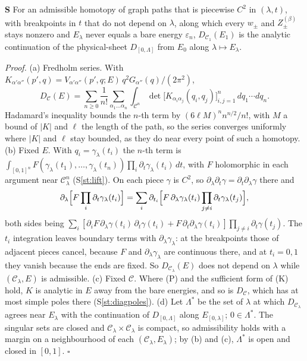 \documentclass[11pt]{article}
\newcounter{stmt}
\newenvironment{stmt}[1]{\par\smallskip\refstepcounter{stmt}\noindent\textbf{S\thestmt}\enspace[\textsf{#1}]\enspace\ignorespaces}{\par\smallskip}
\newcommand{\Sr}[1]{S\ref{#1}}
\begin{document}
\begin{stmt}{theorem}\label{st:continuation}
For an admissible homotopy of graph paths that is piecewise $C^2$ in $(\lambda,t)$, with breakpoints in $t$ that do not depend on $\lambda$, along which every $w_\pm$ and $Z^{(\beta)}_\pm$ stays nonzero and $E_\lambda$ never equals a bare energy $\varepsilon_n$, $D_{\mathcal C_1}(E_1)$ is the analytic continuation of the physical-sheet $D_{[0,\Lambda]}$ from $E_0$ along $\lambda\mapsto E_\lambda$.
\end{stmt}
\noindent\emph{Proof.} (a) Fredholm series. With $K_{\alpha'\alpha''}(p',q)=V_{\alpha'\alpha''}(p',q;E)\,q^2G_{\alpha''}(q)/(2\pi^2)$,
\[
D_{\mathcal C}(E)=\sum_{n\ge0}\frac1{n!}\sum_{\alpha_1\dots\alpha_n}\int_{\mathcal C^n}\det\bigl[K_{\alpha_i\alpha_j}(q_i,q_j)\bigr]_{i,j=1}^{n}\,dq_1\cdots dq_n .
\]
Hadamard's inequality bounds the $n$-th term by $(6\ell M)^nn^{n/2}/n!$, with $M$ a bound of $|K|$ and $\ell$ the length of the path, so the series converges uniformly where $|K|$ and $\ell$ stay bounded, as they do near every point of such a homotopy.
(b) Fixed $E$. With $q_i=\gamma_\lambda(t_i)$ the $n$-th term is $\int_{[0,1]^n}F(\gamma_\lambda(t_1),\dots,\gamma_\lambda(t_n))\prod_i\partial_t\gamma_\lambda(t_i)\,dt$, with $F$ holomorphic in each argument near $\mathcal C_\lambda^n$ (\Sr{st:lift}). On each piece $\gamma$ is $C^2$, so $\partial_\lambda\partial_t\gamma=\partial_t\partial_\lambda\gamma$ there and
\[
\partial_\lambda\Bigl[F\prod_i\partial_t\gamma_\lambda(t_i)\Bigr]=\sum_i\partial_{t_i}\Bigl[F\,\partial_\lambda\gamma_\lambda(t_i)\prod_{j\ne i}\partial_t\gamma_\lambda(t_j)\Bigr],
\]
both sides being $\sum_i[\partial_iF\,\partial_\lambda\gamma(t_i)\,\partial_t\gamma(t_i)+F\,\partial_t\partial_\lambda\gamma(t_i)]\prod_{j\ne i}\partial_t\gamma(t_j)$. The $t_i$ integration leaves boundary terms with $\partial_\lambda\gamma_\lambda$: at the breakpoints those of adjacent pieces cancel, because $F$ and $\partial_\lambda\gamma_\lambda$ are continuous there, and at $t_i=0,1$ they vanish because the ends are fixed. So $D_{\mathcal C_\lambda}(E)$ does not depend on $\lambda$ while $(\mathcal C_\lambda,E)$ is admissible.
(c) Fixed $\mathcal C$. Where (P) and the sufficient form of (K) hold, $K$ is analytic in $E$ away from the bare energies, and so is $D_{\mathcal C}$, which has at most simple poles there (\Sr{st:diagpoles}).
(d) Let $\Lambda^*$ be the set of $\lambda$ at which $D_{\mathcal C_\lambda}$ agrees near $E_\lambda$ with the continuation of $D_{[0,\Lambda]}$ along $E_{[0,\lambda]}$; $0\in\Lambda^*$. The singular sets are closed and $\mathcal C_\lambda\times\mathcal C_\lambda$ is compact, so admissibility holds with a margin on a neighbourhood of each $(\mathcal C_\lambda,E_\lambda)$; by (b) and (c), $\Lambda^*$ is open and closed in $[0,1]$. $\square$
\end{document}
